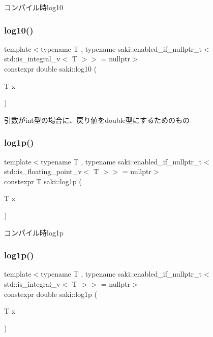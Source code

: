 コンパイル時log10 

\mbox{\label{namespacesaki_a7e5fde452567de6eaae1d5c481497757}} 
\subsubsection{\texorpdfstring{log10()}{log10()}\hspace{0.1cm}{\footnotesize\ttfamily [2/2]}}
{\footnotesize\ttfamily template$<$typename T , typename saki\+::enabled\+\_\+if\+\_\+nullptr\+\_\+t$<$ std\+::is\+\_\+integral\+\_\+v$<$ T $>$$>$  = nullptr$>$ \\
constexpr double saki\+::log10 (\begin{DoxyParamCaption}\item[{T}]{x }\end{DoxyParamCaption})}



引数がint型の場合に、戻り値をdouble型にするためのもの 

\mbox{\label{namespacesaki_ae0b2550b674acc69fa1fbe407917fdc7}} 
\subsubsection{\texorpdfstring{log1p()}{log1p()}\hspace{0.1cm}{\footnotesize\ttfamily [1/2]}}
{\footnotesize\ttfamily template$<$typename T , typename saki\+::enabled\+\_\+if\+\_\+nullptr\+\_\+t$<$ std\+::is\+\_\+floating\+\_\+point\+\_\+v$<$ T $>$$>$  = nullptr$>$ \\
constexpr T saki\+::log1p (\begin{DoxyParamCaption}\item[{T}]{x }\end{DoxyParamCaption})}



コンパイル時log1p 

\mbox{\label{namespacesaki_aec755aa143bd9a0d03c5ebb2dc5dd3de}} 
\subsubsection{\texorpdfstring{log1p()}{log1p()}\hspace{0.1cm}{\footnotesize\ttfamily [2/2]}}
{\footnotesize\ttfamily template$<$typename T , typename saki\+::enabled\+\_\+if\+\_\+nullptr\+\_\+t$<$ std\+::is\+\_\+integral\+\_\+v$<$ T $>$$>$  = nullptr$>$ \\
constexpr double saki\+::log1p (\begin{DoxyParamCaption}\item[{T}]{x }\end{DoxyParamCaption})}



